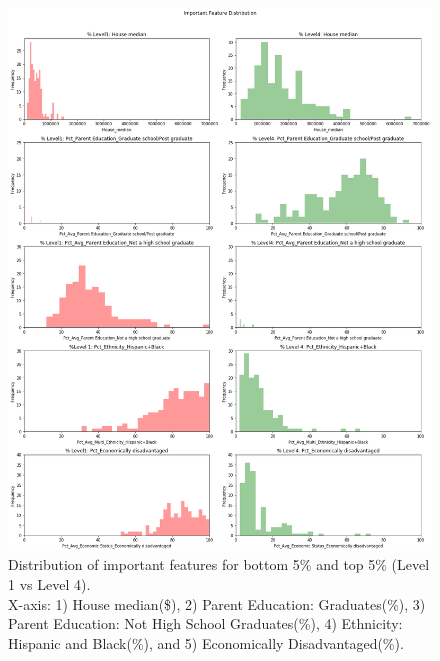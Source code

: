 \documentclass[11pt]{article}
\begin{document}
\begin{figure}[h!]
\centering 
\includegraphics[scale=0.38]{distribution_level1vs4.png}
\caption{Distribution of important features for bottom 5\% and top 5\% (Level 1 vs Level 4).\\
X-axis: 1) House median(\$), 2) Parent Education: Graduates(\%), 3) Parent Education: Not High School Graduates(\%), 4) Ethnicity: Hispanic and Black(\%), and 5) Economically Disadvantaged(\%).}
  \label{fig:distribution_level1and4}
\end{figure}
\end{document}
